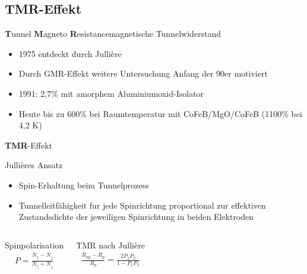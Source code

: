 \subsection{TMR-Effekt}
\begin{frame}{\textbf{T}unnel \textbf{M}agneto \textbf{R}esistance}{magnetische Tunnelwiderstand}
	\begin{block}{}
	    \begin{itemize}
          \item 1975 entdeckt durch Jullière 
          \item Durch GMR-Effekt weitere Untersuchung Anfang der 90er motiviert
	    \end{itemize}
    \end{block}
	\begin{exampleblock}{}
    	\begin{itemize}
          \item 1991: 2,7\% mit amorphem Aluminiumoxid-Isolator
          \item Heute bis zu 600\% bei Raumtemperatur mit CoFeB/MgO/CoFeB (1100\% bei 4,2 K)
        \end{itemize}
    \end{exampleblock}
\end{frame}

\begin{frame}{\textbf{T}\textbf{M}\textbf{R}-Effekt}{}
	\begin{block}{Jullières Ansatz}
    \begin{itemize}
      \item Spin-Erhaltung beim Tunnelprozess
      \item Tunnelleitfähigkeit fur jede Spinrichtung proportional zur effektiven Zustandsdichte der jeweiligen Spinrichtung in beiden Elektroden   
    \end{itemize}
    	
    \end{block}
	\begin{columns}
			\begin{block}{Spinpolarisation}
		 		\begin{align*}
			    	P = \frac{N_\uparrow - N_\downarrow}{N_\uparrow + N_\downarrow}
			    \end{align*}
			\end{block}
	    	\begin{block}{TMR nach Jullière}
				\begin{align*}
			    	\frac{R_{ap}-R_{p}}{R_{p}} = \frac{2P_1P_2}{1-P_1P_2}
		    	\end{align*}
	 		\end{block}
	\end{columns}
\end{frame}